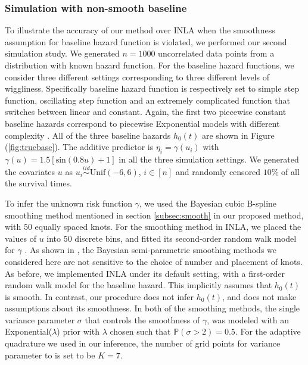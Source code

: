 \documentclass[ba]{imsart}
\begin{document}
\subsubsection{Simulation with non-smooth baseline}\label{subsubsec:sim2}

To illustrate the accuracy of our method over INLA when the smoothness assumption for baseline hazard function is violated, we performed our second simulation study. We generated $n = 1000$ uncorrelated data points from a distribution with known hazard function. For the baseline hazard functions, we consider three different settings corresponding to three different levels of wiggliness. Specifically baseline hazard function is respectively set to simple step function, oscillating step function and an extremely complicated function that switches between linear and constant. Again, the first two piecewise constant baseline hazards correspond to piecewise Exponential models with different complexity \citep{piecewiseExp}. All of the three baseline hazards $h_{0}(t)$ are shown in Figure (\ref{fig:truebase}). The additive predictor is $\eta_{i} = \gamma\left(u_{i}\right)$ with $\gamma(u) = 1.5 [ \text{sin}(0.8u) + 1 ]$ in all the three simulation settings. We generated the covariates $u$ as  $u_{i}\overset{iid}{\sim}\text{Unif}(-6,6)$, $i \in [n]$ and randomly censored $10\%$ of all the survival times.



To infer the unknown risk function $\gamma$, we used the Bayesian cubic B-spline smoothing method mentioned in section \ref{subsec:smooth} in our proposed method, with $50$ equally spaced knots. For the smoothing method in INLA, we placed the values of $u$ into $50$ discrete bins, and fitted its second-order random walk model for $\gamma$ \citep{rw2}. As shown in \cite{casecross}, the Bayesian semi-parametric smoothing methods we considered here are not sensitive to the choice of number and placement of knots. 
As before, we implemented INLA under its default setting, with a first-order random walk model for the baseline hazard. This implicitly assumes that $h_{0}(t)$ is smooth. In contrast, our procedure does not infer $h_{0}(t)$, and does not make assumptions about its smoothness. In both of the smoothing methods, the single variance parameter $\sigma$ that controls the smoothness of $\gamma$, was modeled with an Exponential($\lambda$) prior with $\lambda$ chosen such that $\mathbb{P}\left( \sigma > 2\right) = 0.5$. For the adaptive quadrature we used in our inference, the number of grid points for variance parameter to is set to be $K = 7$.
\end{document}
